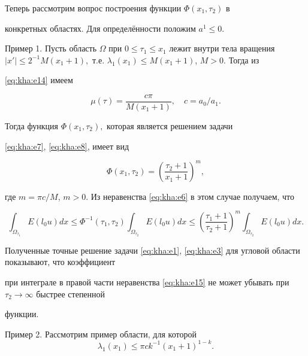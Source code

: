 Теперь рассмотрим вопрос построения функции $\Phi(x_1,\tau_2)$ в

конкретных областях. Для определённости положим $a^1\leqslant 0.$



\smallskip



{\small \sc Пример 1.} Пусть область $\Omega$ при $0 \leqslant \tau_1 \leqslant x_1 $ лежит внутри тела вращения $

|x'|\leqslant 2^{-1}M(x_1+1),$ т.е. $\lambda_1{(x_1)}\leqslant M(x_1+1)$, $M>0. $ Тогда из

\eqref{eq:kha:e14} имеем

$$

\mu(\tau)=\frac{c\pi}{M(x_1+1)},\quad  c={a_0}/{a_1}.

$$

Тогда функция $\Phi(x_1,\tau_2),$ которая является решением задачи

\eqref{eq:kha:e7}, \eqref{eq:kha:e8}, имеет вид

$$

\Phi(x_1,\tau_2)=\left(\frac{\tau_2+1}{x_1+1}\right)^m,

$$

где  $m=\pi c/M$, $m>0.$ Из неравенства \eqref{eq:kha:e6} в этом случае получаем, что

\begin{equation}\label{eq:kha:e15}

\int _{\Omega_{\tau _1}}E(l_0u)dx \leqslant

\Phi^{-1}(\tau_1,\tau_2) \int _{\Omega_{\tau_2}}E(l_0u)dx

\leqslant\left(\frac{\tau_1+1}{\tau_2+1}\right)^m\int

_{\Omega_{\tau_2}}E(l_0u)dx.

\end{equation}



Полученные точные решение задачи \eqref{eq:kha:e1}, \eqref{eq:kha:e3} для угловой области показывают, что коэффициент

при интеграле в правой части неравенства \eqref{eq:kha:e15} не может убывать при $\tau_2\to\infty$ быстрее  степенной

функции.



\smallskip



{\small \sc Пример 2.} Рассмотрим пример области, для которой $$\lambda_1(x_1)\leqslant\pi ck^{-1}(x_1+1)^{1-k}.$$ 

